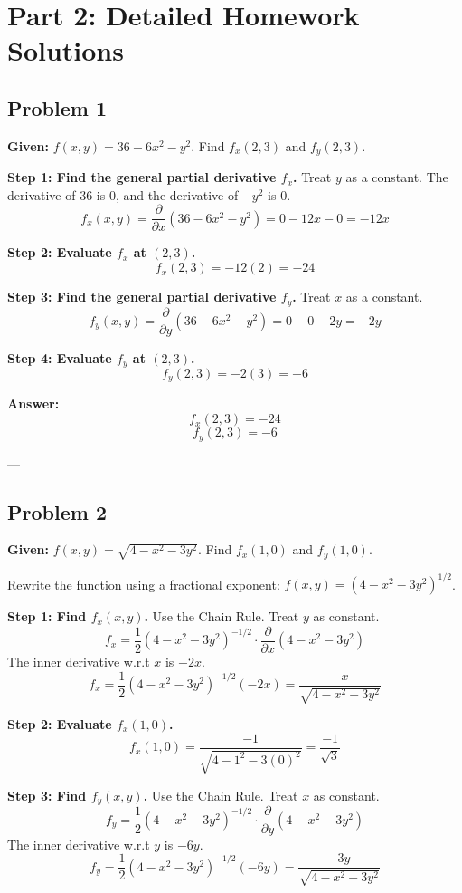 \documentclass{article}
\begin{document}
\newpage

\section{Part 2: Detailed Homework Solutions}

\subsection*{Problem 1}
\textbf{Given:} $f(x, y) = 36 - 6x^2 - y^2$. Find $f_x(2, 3)$ and $f_y(2, 3)$.

\textbf{Step 1: Find the general partial derivative $f_x$.}
Treat $y$ as a constant. The derivative of $36$ is 0, and the derivative of $-y^2$ is 0.
\[ f_x(x, y) = \frac{\partial}{\partial x}(36 - 6x^2 - y^2) = 0 - 12x - 0 = -12x \]

\textbf{Step 2: Evaluate $f_x$ at $(2, 3)$.}
\[ f_x(2, 3) = -12(2) = -24 \]

\textbf{Step 3: Find the general partial derivative $f_y$.}
Treat $x$ as a constant.
\[ f_y(x, y) = \frac{\partial}{\partial y}(36 - 6x^2 - y^2) = 0 - 0 - 2y = -2y \]

\textbf{Step 4: Evaluate $f_y$ at $(2, 3)$.}
\[ f_y(2, 3) = -2(3) = -6 \]

\textbf{Answer:}
\[ f_x(2, 3) = -24 \]
\[ f_y(2, 3) = -6 \]

---

\subsection*{Problem 2}
\textbf{Given:} $f(x, y) = \sqrt{4 - x^2 - 3y^2}$. Find $f_x(1, 0)$ and $f_y(1, 0)$.

Rewrite the function using a fractional exponent: $f(x, y) = (4 - x^2 - 3y^2)^{1/2}$.

\textbf{Step 1: Find $f_x(x, y)$.}
Use the Chain Rule. Treat $y$ as constant.
\[ f_x = \frac{1}{2}(4 - x^2 - 3y^2)^{-1/2} \cdot \frac{\partial}{\partial x}(4 - x^2 - 3y^2) \]
The inner derivative w.r.t $x$ is $-2x$.
\[ f_x = \frac{1}{2}(4 - x^2 - 3y^2)^{-1/2} (-2x) = \frac{-x}{\sqrt{4 - x^2 - 3y^2}} \]

\textbf{Step 2: Evaluate $f_x(1, 0)$.}
\[ f_x(1, 0) = \frac{-1}{\sqrt{4 - 1^2 - 3(0)^2}} = \frac{-1}{\sqrt{3}} \]

\textbf{Step 3: Find $f_y(x, y)$.}
Use the Chain Rule. Treat $x$ as constant.
\[ f_y = \frac{1}{2}(4 - x^2 - 3y^2)^{-1/2} \cdot \frac{\partial}{\partial y}(4 - x^2 - 3y^2) \]
The inner derivative w.r.t $y$ is $-6y$.
\[ f_y = \frac{1}{2}(4 - x^2 - 3y^2)^{-1/2} (-6y) = \frac{-3y}{\sqrt{4 - x^2 - 3y^2}} \]
\end{document}
